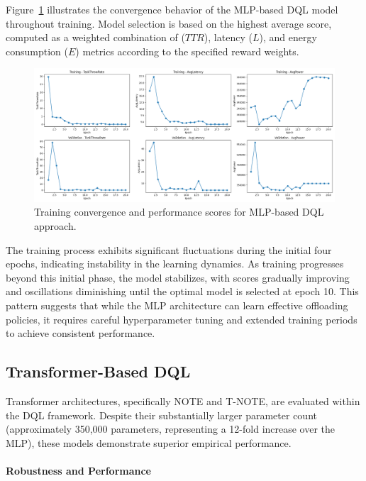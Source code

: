 \documentclass[preprint,3p,authoryear]{elsarticle}
\begin{document}
Figure~\ref{fig:mlp-score-plot} illustrates the convergence behavior of the MLP-based DQL model throughout training. Model selection is based on the highest average score, computed as a weighted combination of ($TTR$), latency ($L$), and energy consumption ($E$) metrics according to the specified reward weights.

\begin{figure}[H]
    \centering
    \includegraphics[width=1\linewidth]{figs/MLP/score_plot.png}
    \caption{Training convergence and performance scores for MLP-based DQL approach.}
    \label{fig:mlp-score-plot}
\end{figure}

The training process exhibits significant fluctuations during the initial four epochs, indicating instability in the learning dynamics. As training progresses beyond this initial phase, the model stabilizes, with scores gradually improving and oscillations diminishing until the optimal model is selected at epoch 10. This pattern suggests that while the MLP architecture can learn effective offloading policies, it requires careful hyperparameter tuning and extended training periods to achieve consistent performance.

\subsection{Transformer-Based DQL}\label{subsec:transformer_perf}

Transformer architectures, specifically NOTE and T-NOTE, are evaluated within the DQL framework. Despite their substantially larger parameter count (approximately 350,000 parameters, representing a 12-fold increase over the MLP), these models demonstrate superior empirical performance.

\paragraph{Robustness and Performance}
\end{document}
